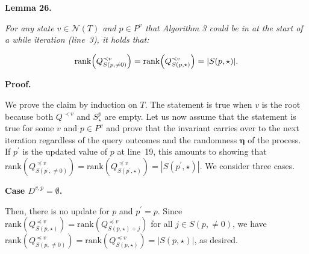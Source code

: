 \documentclass[10pt,a4paper]{article}
\begin{document}


\par\medskip\noindent\textbf{
\textbf{Lemma 26}\textbf{.}
}\par



\emph{For any state $v\in\mathcal{N}(T)$ and $p\in P^{v}$ that Algorithm 3 could be in at the start of a while iteration (line 3), it holds that:}\par


\[\begin{gathered}
\mathrm{rank}\Big{(}Q^{\prec v}_{S(p,\neq 0)}\Big{)}=\mathrm{rank}\Big{(}Q^{\prec v}_{S(p,\star)}\Big{)}=|S(p,\star)|.
\end{gathered}\]






\par\medskip\noindent\textbf{Proof.}\par




We prove the claim by induction on $T$. The statement is true when $v$ is the root because both $Q^{\prec v}$ and $S^{p}_{\star}$ are empty. Let us now assume that the statement is true for some $v$ and $p\in P^{v}$ and prove that the invariant carries over to the next iteration regardless of the query outcomes and the randomness $\bm{\eta}$ of the process. If $p^{\prime}$ is the updated value of $p$ at line 19, this amounts to showing that $\mathrm{rank}(Q^{\preceq v}_{S(p^{\prime},\neq 0)})=\mathrm{rank}(Q^{\preceq v}_{S(p^{\prime},\star)})=|S(p^{\prime},\star)|$. We consider three cases.\par





\par\medskip\noindent\textbf{Case $D^{v,p}=\emptyset$.}\par




Then, there is no update for $p$ and $p^{\prime}=p$. Since $\mathrm{rank}(Q^{\preceq v}_{S(p,\star)})=\mathrm{rank}(Q^{\preceq v}_{S(p,\star)+j})$ for all $j\in S(p,\neq 0)$, we have $\mathrm{rank}(Q^{\preceq v}_{S(p,\neq 0)})=\mathrm{rank}(Q^{\preceq v}_{S(p,\star)})=|S(p,\star)|$, as desired.\par
\end{document}
